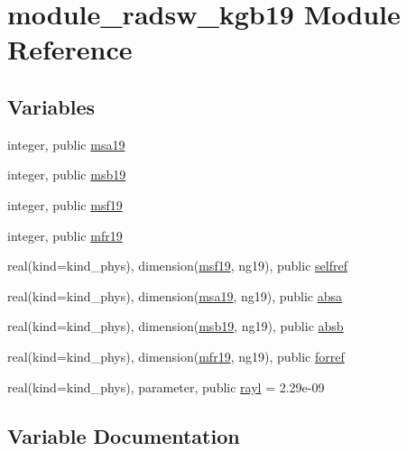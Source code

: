 \hypertarget{namespacemodule__radsw__kgb19}{}\section{module\+\_\+radsw\+\_\+kgb19 Module Reference}
\label{namespacemodule__radsw__kgb19}
\subsection*{Variables}
\begin{DoxyCompactItemize}
\item 
integer, public \hyperlink{namespacemodule__radsw__kgb19_a498993cce64baa8f22c8dfdce632cf85}{msa19}
\item 
integer, public \hyperlink{group__module__radsw__main_ga42771fcf9dd17b5c9d0d03cb2bf1c923}{msb19}
\item 
integer, public \hyperlink{group__module__radsw__main_ga86778b12ff439f4f83fda891e7ae2bfe}{msf19}
\item 
integer, public \hyperlink{group__module__radsw__main_ga57f837ef4316dc2441bca3fde3998156}{mfr19}
\item 
real(kind=kind\+\_\+phys), dimension(\hyperlink{group__module__radsw__main_ga86778b12ff439f4f83fda891e7ae2bfe}{msf19}, ng19), public \hyperlink{group__module__radsw__main_gadb26cae00c05ac5c048a4db5a319a2eb}{selfref}
\item 
real(kind=kind\+\_\+phys), dimension(\hyperlink{namespacemodule__radsw__kgb19_a498993cce64baa8f22c8dfdce632cf85}{msa19}, ng19), public \hyperlink{group__module__radsw__main_gad9a6fc80122a2f06d9f2277d74e00c85}{absa}
\item 
real(kind=kind\+\_\+phys), dimension(\hyperlink{group__module__radsw__main_ga42771fcf9dd17b5c9d0d03cb2bf1c923}{msb19}, ng19), public \hyperlink{group__module__radsw__main_gad1171c012a1615c4b98eb3e95276867d}{absb}
\item 
real(kind=kind\+\_\+phys), dimension(\hyperlink{group__module__radsw__main_ga57f837ef4316dc2441bca3fde3998156}{mfr19}, ng19), public \hyperlink{group__module__radsw__main_gabb4c30ad8e82694b33df78bb2687df6d}{forref}
\item 
real(kind=kind\+\_\+phys), parameter, public \hyperlink{group__module__radsw__main_gac79ad61e8d246d6075664df4201373d7}{rayl} = 2.\+29e-\/09
\end{DoxyCompactItemize}


\subsection{Variable Documentation}

